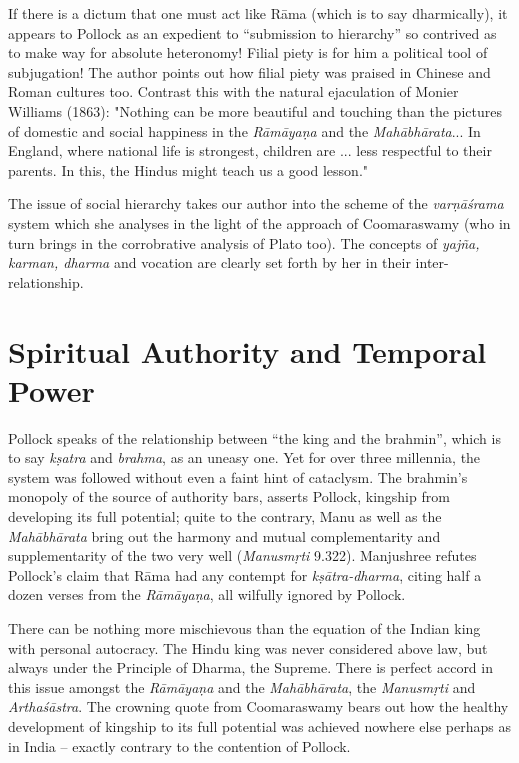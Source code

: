 If there is a dictum that one must act like Rāma (which is to say dharmically), it appears to Pollock as an expedient to “submission to hierarchy” so contrived as to make way for absolute heteronomy! Filial piety is for him a political tool of subjugation! The author points out how filial piety was praised in Chinese and Roman cultures too. Contrast this with the natural ejaculation of Monier Williams (1863): "Nothing can be more beautiful and touching than the pictures of domestic and social happiness in the {\sl Rāmāyaṇa} and the {\sl Mahābhārata}... In England, where national life is strongest, children are ... less respectful to their parents. In this, the Hindus might teach us a good lesson."

The issue of social hierarchy takes our author into the scheme of the {\sl varṇāśrama} system which she analyses in the light of the approach of Coomaraswamy (who in turn brings in the corrobrative analysis of Plato too). The concepts of {\sl yajña, karman, dharma} and vocation are clearly set forth by her in their inter-relationship.

\section*{Spiritual Authority and Temporal Power}

Pollock speaks of the relationship between “the king and the brahmin”, which is to say {\sl kṣatra} and {\sl brahma}, as an uneasy one. Yet for over three millennia, the system was followed without even a faint hint of cataclysm. The brahmin's monopoly of the source of authority bars, asserts Pollock, kingship from developing its full potential; quite to the contrary, Manu as well as the {\sl Mahābhārata} bring out the harmony and mutual complementarity and supplementarity of the two very well ({\sl Manusmṛti} 9.322). Manjushree refutes Pollock's claim that Rāma had any contempt for {\sl kṣātra-dharma}, citing half a dozen verses from the {\sl Rāmāyaṇa}, all wilfully ignored by Pollock.

There can be nothing more mischievous than the equation of the Indian king with personal autocracy. The Hindu king was never considered above law, but always under the Principle of Dharma, the Supreme. There is perfect accord in this issue amongst the {\sl Rāmāyaṇa} and the {\sl Mahābhārata}, the {\sl Manusmṛti} and {\sl Arthaśāstra}. The crowning quote from Coomaraswamy bears out how the healthy development of kingship to its full potential was achieved nowhere else perhaps as in India -- exactly contrary to the contention of Pollock.

